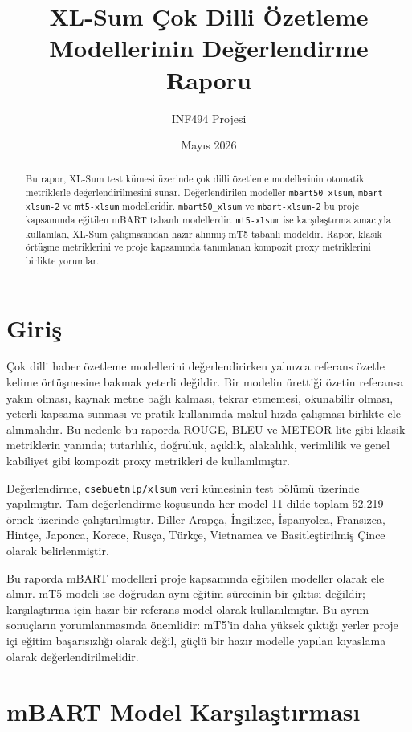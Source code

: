 \documentclass[12pt,a4paper]{article}
\title{XL-Sum Çok Dilli Özetleme Modellerinin Değerlendirme Raporu}
\author{INF494 Projesi}
\date{Mayıs 2026}
\begin{document}
\maketitle

\begin{abstract}
Bu rapor, XL-Sum test kümesi üzerinde çok dilli özetleme modellerinin otomatik metriklerle değerlendirilmesini sunar. Değerlendirilen modeller \texttt{mbart50\_xlsum}, \texttt{mbart-xlsum-2} ve \texttt{mt5-xlsum} modelleridir. \texttt{mbart50\_xlsum} ve \texttt{mbart-xlsum-2} bu proje kapsamında eğitilen mBART tabanlı modellerdir. \texttt{mt5-xlsum} ise karşılaştırma amacıyla kullanılan, XL-Sum çalışmasından hazır alınmış mT5 tabanlı modeldir. Rapor, klasik örtüşme metriklerini ve proje kapsamında tanımlanan kompozit proxy metriklerini birlikte yorumlar.
\end{abstract}

\section{Giriş}

Çok dilli haber özetleme modellerini değerlendirirken yalnızca referans özetle kelime örtüşmesine bakmak yeterli değildir. Bir modelin ürettiği özetin referansa yakın olması, kaynak metne bağlı kalması, tekrar etmemesi, okunabilir olması, yeterli kapsama sunması ve pratik kullanımda makul hızda çalışması birlikte ele alınmalıdır. Bu nedenle bu raporda ROUGE, BLEU ve METEOR-lite gibi klasik metriklerin yanında; tutarlılık, doğruluk, açıklık, alakalılık, verimlilik ve genel kabiliyet gibi kompozit proxy metrikleri de kullanılmıştır.

Değerlendirme, \texttt{csebuetnlp/xlsum} veri kümesinin test bölümü üzerinde yapılmıştır. Tam değerlendirme koşusunda her model 11 dilde toplam 52.219 örnek üzerinde çalıştırılmıştır. Diller Arapça, İngilizce, İspanyolca, Fransızca, Hintçe, Japonca, Korece, Rusça, Türkçe, Vietnamca ve Basitleştirilmiş Çince olarak belirlenmiştir.

Bu raporda mBART modelleri proje kapsamında eğitilen modeller olarak ele alınır. mT5 modeli ise doğrudan aynı eğitim sürecinin bir çıktısı değildir; karşılaştırma için hazır bir referans model olarak kullanılmıştır. Bu ayrım sonuçların yorumlanmasında önemlidir: mT5'in daha yüksek çıktığı yerler proje içi eğitim başarısızlığı olarak değil, güçlü bir hazır modelle yapılan kıyaslama olarak değerlendirilmelidir.

\section{mBART Model Karşılaştırması}
\end{document}
